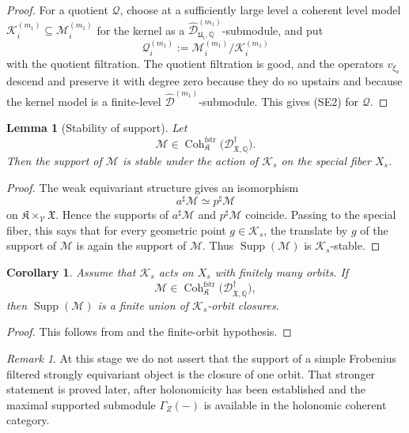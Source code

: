 \documentclass[11pt]{amsart}
\theoremstyle{plain}
\newtheorem{lemma}{Lemma}[section]
\newtheorem{corollary}{Corollary}[section]
\theoremstyle{definition}
\theoremstyle{remark}
\newtheorem{remark}{Remark}[section]
\newcommand{\Coh}{\operatorname{Coh}}
\newcommand{\Supp}{\operatorname{Supp}}
\newcommand{\fstr}{\mathrm{fstr}}
\begin{document}
\begin{proof}
For a quotient \(\mathcal Q\), choose at a sufficiently large level a coherent
level model \(\mathcal K_i^{(m_1)}\subseteq\mathcal M_i^{(m_1)}\) for the
kernel as a
\(\widehat{\mathscr D}^{(m_1)}_{\mathfrak U_i,\mathbb Q}\)-submodule, and put
\[
  \mathcal Q_i^{(m_1)}
  :=
  \mathcal M_i^{(m_1)}/\mathcal K_i^{(m_1)}
\]
with the quotient filtration. The quotient filtration is good, and the
operators \(v_{\xi_a}\) descend and preserve it with degree zero because they
do so upstairs and because the kernel model is a finite-level
\(\widehat{\mathscr D}^{(m_1)}\)-submodule. This gives \textup{(SE2)} for
\(\mathcal Q\).
\end{proof}

\begin{lemma}[Stability of support]
\label{lem:support-stability}
Let
\[
  \mathcal M\in
  \Coh^{\fstr}_{\mathfrak K}
  \bigl(\mathscr D^\dagger_{\mathfrak X,\mathbb Q}\bigr).
\]
Then the support of \(\mathcal M\) is stable under the action of
\(\mathcal K_s\) on the special fiber \(X_s\).
\end{lemma}

\begin{proof}
The weak equivariant structure gives an isomorphism
\[
  a^\sharp\mathcal M\simeq p^\sharp\mathcal M
\]
on \(\mathfrak K\times_{\mathcal V}\mathfrak X\). Hence the supports of
\(a^\sharp\mathcal M\) and \(p^\sharp\mathcal M\) coincide. Passing to the
special fiber, this says that for every geometric point \(g\in \mathcal K_s\),
the translate by \(g\) of the support of \(\mathcal M\) is again the support of
\(\mathcal M\). Thus \(\Supp(\mathcal M)\) is \(\mathcal K_s\)-stable.
\end{proof}

\begin{corollary}
\label{cor:support-union-orbits}
Assume that \(\mathcal K_s\) acts on \(X_s\) with finitely many orbits. If
\[
  \mathcal M\in
  \Coh^{\fstr}_{\mathfrak K}
  \bigl(\mathscr D^\dagger_{\mathfrak X,\mathbb Q}\bigr),
\]
then \(\Supp(\mathcal M)\) is a finite union of \(\mathcal K_s\)-orbit
closures.
\end{corollary}

\begin{proof}
This follows from  and the finite-orbit
hypothesis.
\end{proof}

\begin{remark}
\label{rem:no-simple-support-before-holonomicity}
At this stage we do not assert that the support of a simple Frobenius filtered strongly
equivariant object is the closure of one orbit. That stronger statement is
proved later, after holonomicity has been established and the maximal
supported submodule \(\Gamma_Z(-)\) is available in the holonomic coherent
category.
\end{remark}
\end{document}

